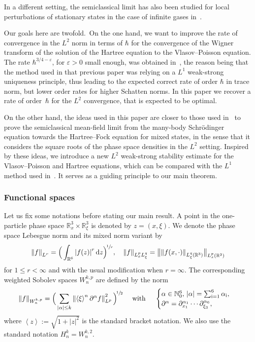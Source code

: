 \documentclass[JEP,XML,SOM,Unicode,NoEqCountersInSection,published]{cedram}
\theoremstyle{definition}
\newcommand {\N} {\mathbb N}
\newcommand {\RR} {\mathbb R}
\newcommand {\Rd} {\RR^3}
\newcommand {\RRd} {\RR^6}
\let\lt\left
\let\rt\right
\renewcommand {\(} {\lt(}
\renewcommand {\)} {\rt)}
\newcommand {\bangle}[1] {\lt\langle #1\rt\rangle}
\newcommand {\weight}[1] {\bangle{#1}}
\newcommand {\n}[1] {\lt\lvert #1 \rt\rvert}
\newcommand {\nrm}[1] {\lt\lVert #1\rt\rVert}
\newcommand {\bnrm}[1] {\big\lVert #1\big\rVert}
\newcommand {\Nrm}[2] {\nrm{#1}_{#2}}
\newcommand {\bNrm}[2] {\bnrm{#1}_{#2}}
\let\bd\partial
\let\eps\varepsilon
\renewcommand {\d} {\mathop{}\!\mathrm{d}}
\newcommand {\intdd} {\int_{\RRd}}
\newcommand {\ii} {\mathrm{i}}
\begin{document}
In a different setting, the semiclassical limit has also been studied for local perturbations of stationary states in the case of infinite gases in~\cite{lewin_hartree_2020}.

Our goals here are twofold.~On the one hand, we want to improve the rate of convergence in the $L^2$ norm in terms of $\hbar$ for the convergence of the Wigner transform of the solution of the Hartree equation to the Vlasov--Poisson equation. The rate $\hbar^{3/4-\eps}$, for $\eps>0$ small enough, was obtained in~\cite{lafleche_strong_2021}, the reason being that the method used in that previous paper was relying on a $L^1$ weak-strong uniqueness principle, thus leading to the expected correct rate of order $\hbar$ in trace norm, but lower order rates for higher Schatten norms. In this paper we recover a rate of order~$\hbar$ for the $L^2$ convergence, that is expected to be optimal.

On the other hand, the ideas used in this paper are closer to those used in~\cite{benedikter_mean-field_2016-1, chong_many-body_2021} to prove the semiclassical mean-field limit from the many-body Schrödinger equation towards the Hartree--Fock equation for mixed states, in the sense that it considers the square roots of the phase space densities in the $L^2$ setting. Inspired by these ideas, we introduce a new $L^2$ weak-strong stability estimate for the Vlasov--Poisson and Hartree equations, which can be compared with the $L^1$ method used in~\cite{lafleche_strong_2021}. It serves as a guiding principle to our main theorem.


\subsubsection{Functional spaces} Let us fix some notations before stating our main result. A point in the one-particle phase space $\Rd_x\times \Rd_{\xi}$ is denoted by $z = (x, \xi)$. We denote the phase space Lebesgue norm and its mixed norm variant by
\begin{equation*}
\Nrm{f}{L^r} = \Big(\intdd \n{f(z)}^r\d z\Big)^{\!\sfrac{1}{r}}, \quad \Nrm{f}{L^p_x L^q_{\xi}} = \bNrm{\!\Nrm{f(x, \cdot)}{L^q_{\xi}(\Rd)}\!}{L^p_x(\Rd)}
\end{equation*}
for $1\le r<\infty$ and with the usual modification when $r=\infty$. The corresponding weighted Sobolev spaces $W^{k,p}_n$ are defined by the norm
\begin{equation*}
\Nrm{f}{W^{k,p}_{n}} = \Big(\sum_{\substack{ \n{\alpha} \le k}}\Nrm{\weight{\xi}^n\partial^\alpha f}{L^{p}}^2\Big)^{\!\sfrac{1}{2}}\quad \text{ with }\quad
\begin{cases}
\alpha \in {\N_{0}^6},\, \n{\alpha}= \sum^6_{\ii=1} \alpha_{\ii},
\\
\bd^\alpha = \bd_{x_1}^{\alpha_1}\cdots \bd_{\xi_3}^{\alpha_6},
\end{cases}
\end{equation*}
where $\weight{z}:=\sqrt{1+|z|^2}$ is the standard bracket notation. We also use the standard notation $H^{k}_{n} = W^{k,2}_{n}$.
\end{document}
